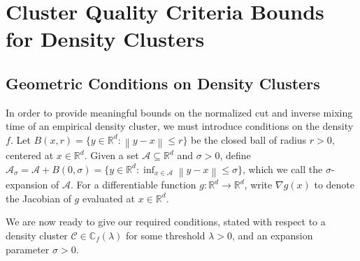 \documentclass{article}
\newcommand{\Reals}{\mathbb{R}}
\newcommand{\Rd}{\Reals^d}
\newcommand{\norm}[1]{\left\lVert#1\right\rVert}
\newcommand{\1}{\mathbf{1}}
\newcommand{\Cbb}{\mathbb{C}}
\newcommand{\Cset}{\mathcal{C}}
\newcommand{\Aset}{\mathcal{A}}
\newcommand{\Asig}{\Aset_{\sigma}}
\theoremstyle{aldenthm}
\theoremstyle{aldenrmrk}
\begin{document}
\section{Cluster Quality Criteria Bounds for Density Clusters}  
\label{sec: cluster_quality_bounds}

\subsection{Geometric Conditions on Density Clusters}

In order to provide meaningful bounds on the normalized cut and inverse mixing
time of an empirical density cluster, we must introduce conditions on the
density $f$. Let $B(x,r) = \{y \in \Rd: \norm{y - x} \leq r\}$ be the closed
ball of radius $r > 0$, centered at $x \in \Rd$.  Given a set $\Aset
\subseteq \Rd$ and $\sigma > 0$, define $\Asig = \Aset + B(0,\sigma) = \{y \in
\Rd: \inf_{x \in \Aset} \norm{y - x} \leq \sigma\}$, which we call the
$\sigma$-expansion of $\Aset$. For a differentiable function $g: \Rd \to \Rd$, write $\nabla g(x)$ to denote the Jacobian of $g$ evaluated at $x \in \Rd$. 

We are now ready to give our required conditions, stated with respect to a density
cluster $\Cset \in \Cbb_f(\lambda)$ for some threshold $\lambda > 0$, and an
expansion parameter $\sigma > 0$. 
\end{document}
